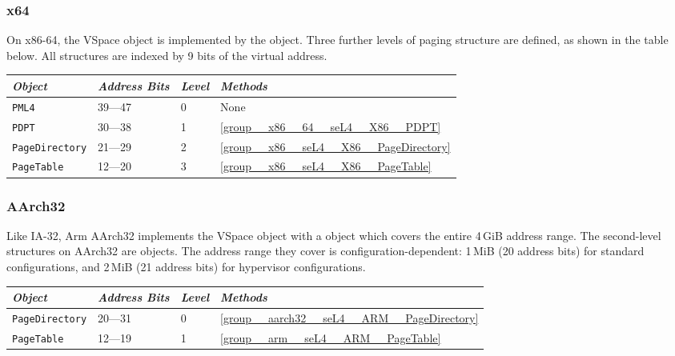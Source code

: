 \subsubsection{x64}

On x86-64, the VSpace object is implemented by the  object. Three further levels of
paging structure are defined, as shown in the table below. All structures are indexed by 9 bits of
the virtual address.

\begin{tabularx}{\textwidth}{Xlll} \toprule
\emph{Object}          & \emph{Address Bits} & \emph{Level} & \emph{Methods} \\ \midrule
\texttt{PML4}          & 39---47             & 0            & None \\
\texttt{PDPT}          & 30---38             & 1            & \autoref{group__x86__64__seL4__X86__PDPT} \\
\texttt{PageDirectory} & 21---29             & 2            & \autoref{group__x86__seL4__X86__PageDirectory} \\
\texttt{PageTable}     & 12---20             & 3            & \autoref{group__x86__seL4__X86__PageTable} \\
\bottomrule
\end{tabularx}

\subsubsection{AArch32}

Like IA-32, Arm AArch32 implements the VSpace object with a  object which
covers the entire 4\,GiB address range.  The second-level structures on AArch32 are
 objects. The address range they cover is configuration-dependent: 1\,MiB
(20 address bits) for standard configurations, and 2\,MiB (21 address bits) for hypervisor
configurations.

\begin{tabularx}{\textwidth}{Xlll} \toprule
\emph{Object}          & \emph{Address Bits} & \emph{Level} & \emph{Methods} \\ \midrule
\texttt{PageDirectory} & 20---31             & 0            & \autoref{group__aarch32__seL4__ARM__PageDirectory} \\
\texttt{PageTable}     & 12---19             & 1            & \autoref{group__arm__seL4__ARM__PageTable} \\
\bottomrule
\end{tabularx}

